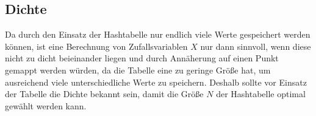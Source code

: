 \subsection{Dichte}
\label{Dichte}
Da durch den Einsatz der Hashtabelle nur endlich viele Werte gespeichert werden können, ist 
eine Berechnung von Zufallsvariablen $X$ nur dann sinnvoll, wenn diese nicht zu dicht 
beieinander liegen und durch Annäherung auf einen Punkt gemappt werden würden, da die Tabelle 
eine zu geringe Größe hat, um ausreichend viele unterschiedliche Werte zu speichern. Deshalb 
sollte vor Einsatz der Tabelle die Dichte bekannt sein, damit die Größe $N$ der 
Hashtabelle optimal gewählt werden kann.